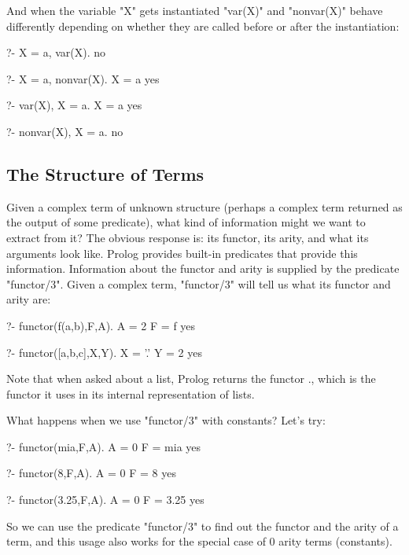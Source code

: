 And  when the variable "X" gets instantiated "var(X)"
and "nonvar(X)" behave differently depending on whether they are
called before or after the instantiation:

\begin{LPNcodedisplay}
?- X = a, var(X).
no

?- X = a, nonvar(X).
X = a
yes

?- var(X), X = a.
X = a
yes

?- nonvar(X), X = a.
no
\end{LPNcodedisplay}




\subsection*{The Structure of Terms}\label{SUBSEC.L9.TERMSTRUCTURE}

Given a complex term of unknown structure (perhaps a complex term
returned as the output of some predicate), what kind of information
might we want to extract from it? The obvious response is: its
functor, its arity, and what its arguments look like. Prolog
provides built-in predicates that provide this
information. Information about the functor and arity is supplied by the predicate
"functor/3".  Given a complex term, "functor/3" will tell us what its
functor and arity are:

\begin{LPNcodedisplay}
?- functor(f(a,b),F,A).
A = 2
F = f
yes

?- functor([a,b,c],X,Y).
X = '.'
Y = 2
yes
\end{LPNcodedisplay}
Note that when asked about a list, Prolog returns the functor ., which
is the functor it uses in its internal representation of lists.

What happens when we use "functor/3" with constants? Let's try:
\begin{LPNcodedisplay}
?- functor(mia,F,A).
A = 0
F = mia
yes

?- functor(8,F,A).
A = 0
F = 8
yes

?- functor(3.25,F,A).
A = 0
F = 3.25
yes
\end{LPNcodedisplay}

So we can use the predicate "functor/3" to find out the functor and the
arity of a term, and this usage also works for the special case of 0
arity terms (constants).


